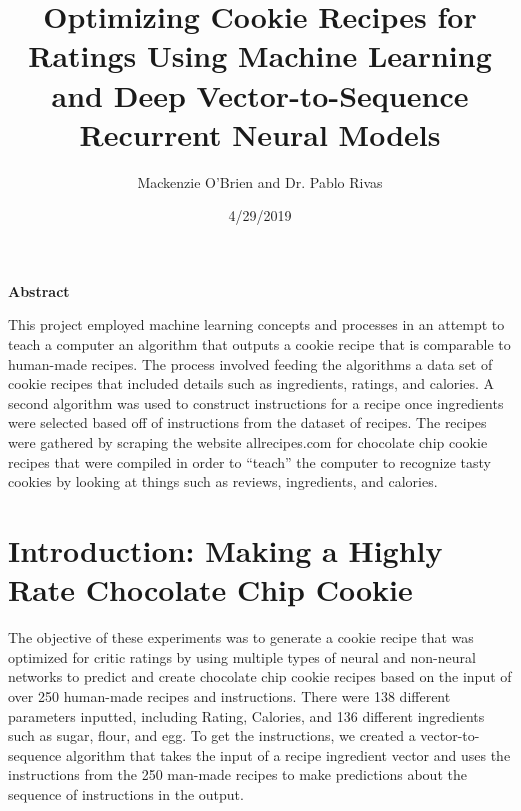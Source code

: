 \documentclass[11pt, a4paper]{article}
\begin{document}
	
	\title{Optimizing Cookie Recipes for Ratings Using Machine Learning and Deep Vector-to-Sequence Recurrent Neural Models}
	\author{Mackenzie O'Brien and Dr. Pablo Rivas}
	\date{4/29/2019}
	\maketitle
	\begin{center}
		\textbf{Abstract}
	\end{center}

	This project employed machine learning concepts and processes in an attempt to teach a computer an algorithm that outputs a cookie recipe that is comparable to human-made recipes.
The process involved feeding the algorithms a data set of cookie recipes that included details such as ingredients, ratings, and calories. A second algorithm was used to construct instructions for a recipe once ingredients were selected based off of instructions from the dataset of recipes.
The recipes were gathered by scraping the website allrecipes.com for chocolate chip cookie recipes that were compiled in order to “teach” the computer to recognize tasty cookies by looking at things such as reviews, ingredients, and calories.
	
	\newpage
	
		\section{ Introduction: Making a Highly Rate Chocolate Chip Cookie}
		 The objective of these experiments was to generate a cookie recipe that was optimized for critic ratings by using multiple types of neural and non-neural networks to predict and create chocolate chip cookie recipes based on the input of over 250 human-made recipes and instructions. There were 138 different parameters inputted, including Rating, Calories, and 136 different ingredients such as sugar, flour, and egg.
		 \newline\newline
		 To get the instructions, we created a vector-to-sequence algorithm that takes the input of a recipe ingredient vector and uses the instructions from the 250 man-made recipes to make predictions about the sequence of instructions in the output.
\end{document}
